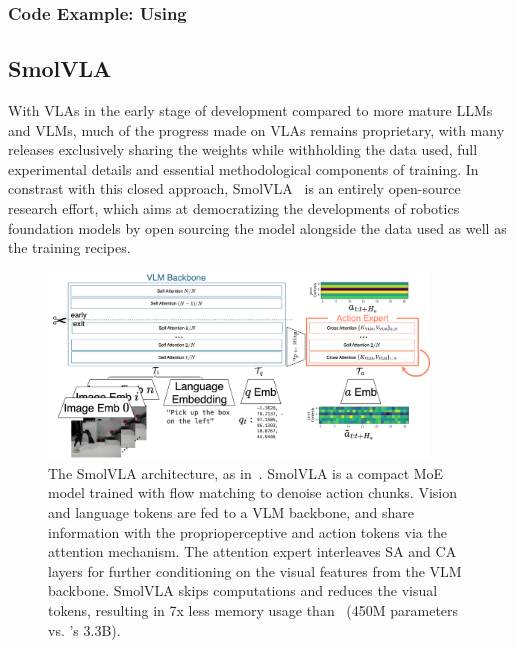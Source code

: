 \subsubsection{Code Example: Using \pizero}

\subsection{SmolVLA}
With VLAs in the early stage of development compared to more mature LLMs and VLMs, much of the progress made on VLAs remains proprietary, with many releases exclusively sharing the weights while withholding the data used, full experimental details and essential methodological components of training.
In constrast with this closed approach, SmolVLA~\citep{shukorSmolVLAVisionLanguageActionModel2025} is an entirely open-source research effort, which aims at democratizing the developments of robotics foundation models by open sourcing the model alongside the data used as well as the training recipes.

\begin{figure}
    \centering
    \includegraphics[width=0.9\textwidth]{figures/ch5/ch5-smolvla.png}
    \caption{The SmolVLA architecture, as in~\citet{shukorSmolVLAVisionLanguageActionModel2025}. SmolVLA is a compact MoE model trained with flow matching to denoise action chunks. Vision and language tokens are fed to a VLM backbone, and share information with the proprioperceptive and action tokens via the attention mechanism. The attention expert interleaves SA and CA layers for further conditioning on the visual features from the VLM backbone. SmolVLA skips computations and reduces the visual tokens, resulting in 7x less memory usage than \pizero~(450M parameters vs. \pizero's 3.3B).}
    \label{fig:ch5-smolvla}
\end{figure}


